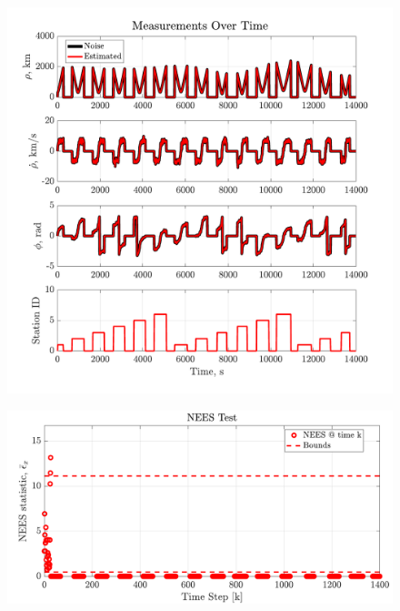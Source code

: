\documentclass[a4paper]{aiaa-tc}
\begin{document}
  \begin{figure}[H]
 \centering
 \includegraphics[width=\textwidth]{Figures/LKF_measurements.pdf}
 \end{figure}
 
  \begin{figure}[H]
 \centering
 \includegraphics[width=\textwidth]{Figures/LKF_NEES.pdf}
 \end{figure}
 
 
\end{document}
